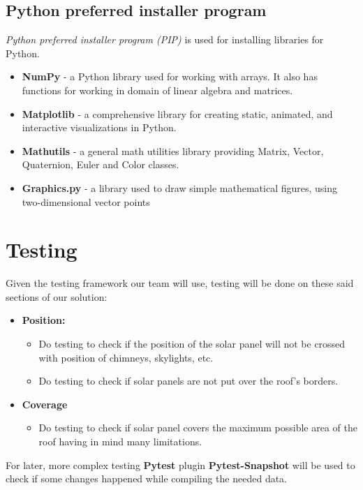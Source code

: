 \documentclass[a4paper,12pt,fleqn]{article}
\begin{document}
\subsection{Python preferred installer program}
\textit{Python preferred installer program (PIP)} is used for installing libraries for Python.
\begin{itemize}
    \item \textbf{NumPy} - a Python library used for working with arrays. It also has functions for working in domain of linear algebra and matrices.
    \item \textbf{Matplotlib} - a comprehensive library for creating static, animated, and interactive visualizations in Python.
    \item \textbf{Mathutils} - a general math utilities library providing Matrix, Vector, Quaternion, Euler and Color classes.
    \item \textbf{Graphics.py} - a library used to draw simple mathematical figures, using two-dimensional vector points
\end{itemize}


\newpage
\section{Testing}
Given the testing framework our team will use, testing will be done on these said sections of our solution:
\begin{itemize}
    \item \textbf{Position:}
    \begin{itemize}
        \item Do testing to check if the position of the solar panel will not be crossed with position of chimneys, skylights, etc.
        \item Do testing to check if solar panels are not put over the roof's borders.
    \end{itemize}
    \item \textbf{Coverage}
    \begin{itemize}
        \item Do testing to check if solar panel covers the maximum possible area of the roof having in mind many limitations.
    \end{itemize}
\end{itemize}
For later, more complex testing \textbf{Pytest} plugin \textbf{Pytest-Snapshot} will be used to check if some changes happened while compiling the needed data.
\end{document}
